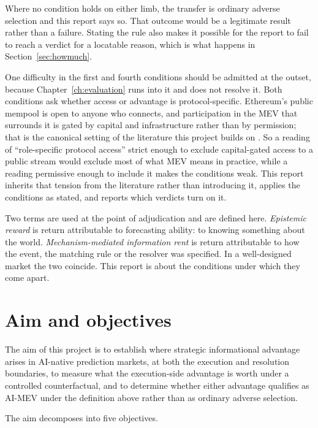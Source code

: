 Where no condition holds on either limb, the transfer is ordinary adverse selection and this
report says so. That outcome would be a legitimate result rather than a failure. Stating the
rule also makes it possible for the report to fail to reach a verdict for a locatable
reason, which is what happens in Section~\ref{sec:howmuch}.

One difficulty in the first and fourth conditions should be admitted at the outset, because
Chapter~\ref{ch:evaluation} runs into it and does not resolve it. Both conditions ask
whether access or advantage is protocol-specific. Ethereum's public mempool is open to
anyone who connects, and participation in the MEV that surrounds it is gated by capital and
infrastructure rather than by permission; that is the canonical setting of the literature
this project builds on \cite{daian2019flashboys,ethereummev}. So a reading of
``role-specific protocol access'' strict enough to exclude capital-gated access to a public
stream would exclude most of what MEV means in practice, while a reading permissive enough
to include it makes the conditions weak. This report inherits that tension from the
literature rather than introducing it, applies the conditions as stated, and reports which
verdicts turn on it.

Two terms are used at the point of adjudication and are defined here. \emph{Epistemic reward} is return attributable to
forecasting ability: to knowing something about the world. \emph{Mechanism-mediated
information rent} is return attributable to how the event, the matching rule or the resolver
was specified. In a well-designed market the two coincide. This report is about the
conditions under which they come apart.

\section{Aim and objectives}
\label{sec:aim}

The aim of this project is to establish where strategic informational advantage arises in
AI-native prediction markets, at both the execution and resolution boundaries, to measure
what the execution-side advantage is worth under a controlled counterfactual, and to
determine whether either advantage qualifies as AI-MEV under the definition above rather
than as ordinary adverse selection.

The aim decomposes into five objectives.

